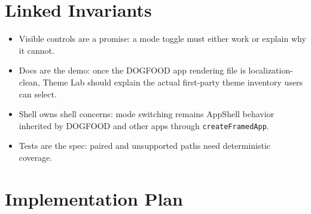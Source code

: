 \section{Linked Invariants}\label{record-183-linked-invariants}

\begin{itemize}
\tightlist
\item
  Visible controls are a promise: a mode toggle must either work or explain why it cannot.
\item
  Docs are the demo: once the DOGFOOD app rendering file is localization-clean, Theme Lab should explain the actual first-party theme inventory users can select.
\item
  Shell owns shell concerns: mode switching remains AppShell behavior inherited by DOGFOOD and other apps through \texttt{c\allowbreak{}r\allowbreak{}e\allowbreak{}a\allowbreak{}t\allowbreak{}e\allowbreak{}F\allowbreak{}r\allowbreak{}a\allowbreak{}m\allowbreak{}e\allowbreak{}d\allowbreak{}A\allowbreak{}p\allowbreak{}p}.
\item
  Tests are the spec: paired and unsupported paths need deterministic coverage.
\end{itemize}

\section{Implementation Plan}\label{record-183-implementation-plan}


